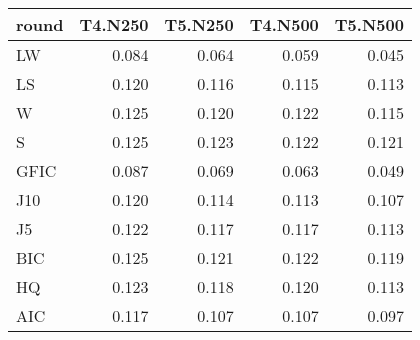 %
\begin{table}[!tbp]
\begin{center}
\begin{tabular}{lrrrr}
\hline\hline
\multicolumn{1}{l}{round}&\multicolumn{1}{c}{T4.N250}&\multicolumn{1}{c}{T5.N250}&\multicolumn{1}{c}{T4.N500}&\multicolumn{1}{c}{T5.N500}\tabularnewline
\hline
LW&0.084&0.064&0.059&0.045\tabularnewline
LS&0.120&0.116&0.115&0.113\tabularnewline
W&0.125&0.120&0.122&0.115\tabularnewline
S&0.125&0.123&0.122&0.121\tabularnewline
GFIC&0.087&0.069&0.063&0.049\tabularnewline
J10&0.120&0.114&0.113&0.107\tabularnewline
J5&0.122&0.117&0.117&0.113\tabularnewline
BIC&0.125&0.121&0.122&0.119\tabularnewline
HQ&0.123&0.118&0.120&0.113\tabularnewline
AIC&0.117&0.107&0.107&0.097\tabularnewline
\hline
\end{tabular}
\end{center}
\end{table}


